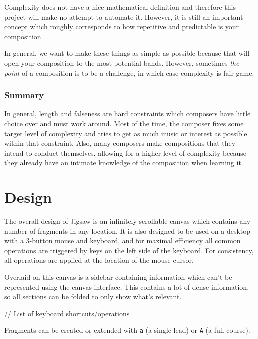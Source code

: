 \documentclass[12pt]{article}
\begin{document}
Complexity does not have a nice mathematical definition and therefore this project will make no
attempt to automate it.  However, it is still an important concept which roughly corresponds to how
repetitive and predictable is your composition.

In general, we want to make these things as simple as possible because that will open your
composition to the most potential bands.  However, sometimes \emph{the point} of a composition is to
be a challenge, in which case complexity is fair game.

\subsubsection{Summary}

In general, length and falseness are hard constraints which composers have little choice over and
must work around.  Most of the time, the composer fixes some target level of complexity and tries
to get as much music or interest as possible within that constraint.  Also, many composers make
compositions that they intend to conduct themselves, allowing for a higher level of complexity
because they already have an intimate knowledge of the composition when learning it.



\pagebreak

\section{Design}

The overall design of Jigsaw is an infinitely scrollable canvas which contains any number of
fragments in any location.  It is also designed to be used on a desktop with a 3-button mouse and
keyboard, and for maximal efficiency all common operations are triggered by keys on the left side of
the keyboard.  For consistency, all operations are applied at the location of the mouse cursor.

Overlaid on this canvas is a sidebar containing information which can't be represented using the
canvas interface.  This contains a lot of dense information, so all sections can be folded to only
show what's relevant.

// List of keyboard shortcuts/operations

Fragments can be created or extended with \verb|a| (a single lead) or \verb|A| (a full course).
\end{document}
